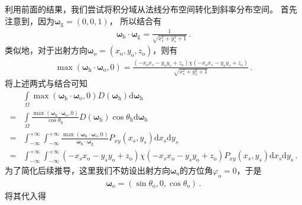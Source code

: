 利用前面的结果，我们尝试将积分域从法线分布空间转化到斜率分布空间。
首先注意到，因为${\bm\omega}_{\mathrm{g}}=(0,0,1)$，
所以结合有
\begin{align}
    {\bm\omega}_{\mathrm{h}}\cdot{\bm\omega}_{\mathrm{g}}
    =\frac{1}{\sqrt{x_s^2+y_s^2+1}}\, .
\end{align}
类似地，对于出射方向${\bm\omega}_{\mathrm{o}}=(x_{\mathrm{o}},y_{\mathrm{o}},z_{\mathrm{o}})$，则有
\begin{align}
    \max({\bm\omega}_{\mathrm{h}}\cdot{\bm\omega}_{\mathrm{o}},0)
    =\frac{(-x_{\mathrm{o}}x_s-y_{\mathrm{o}}y_s+z_{\mathrm{o}})
    \chi(-x_{\mathrm{o}}x_s-y_{\mathrm{o}}y_s+z_{\mathrm{o}})}{\sqrt{x_s^2+y_s^2+1}}\, .
\end{align}
将上述两式与结合可知
\begin{align}\label{eq:08-ex01-trans-normal-slope}
      & \int\limits_{\varOmega}\max({\bm\omega}_{\mathrm{h}}\cdot{\bm\omega}_{\mathrm{o}},0)
    D({\bm\omega}_{\mathrm{h}})\mathrm{d}{\bm\omega}_{\mathrm{h}}\nonumber                          \\
    = & \int\limits_{\varOmega}\frac{\max({\bm\omega}_{\mathrm{h}}\cdot{\bm\omega}_{\mathrm{o}},0)}
    {\cos\theta_{\mathrm{h}}}D({\bm\omega}_{\mathrm{h}})\cos\theta_{\mathrm{h}}\mathrm{d}{\bm\omega}_{\mathrm{h}}\nonumber    \\
    = & \int_{-\infty}^{+\infty}\int_{-\infty}^{+\infty}
    \frac{\max({\bm\omega}_{\mathrm{h}}\cdot{\bm\omega}_{\mathrm{o}},0)}
    {{\bm\omega}_{\mathrm{h}}\cdot{\bm\omega}_{\mathrm{g}}}
    P_{xy}(x_s,y_s)\mathrm{d}x_s\mathrm{d}y_s\nonumber                                              \\
    = & \int_{-\infty}^{+\infty}\int_{-\infty}^{+\infty}
    (-x_sx_{\mathrm{o}}-y_sy_{\mathrm{o}}+z_{\mathrm{o}})
    \chi(-x_sx_{\mathrm{o}}-y_sy_{\mathrm{o}}+z_{\mathrm{o}})
    P_{xy}(x_s,y_s)\mathrm{d}x_s\mathrm{d}y_s\, .
\end{align}
为了简化后续推导，这里我们不妨设出射方向${\bm\omega}_{\mathrm{o}}$的方位角$\varphi_{\mathrm{o}}=0$，于是
\begin{align}
    {\bm\omega}_{\mathrm{o}}=(\sin\theta_{\mathrm{o}},0,\cos\theta_{\mathrm{o}})\, .
\end{align}
将其代入得
